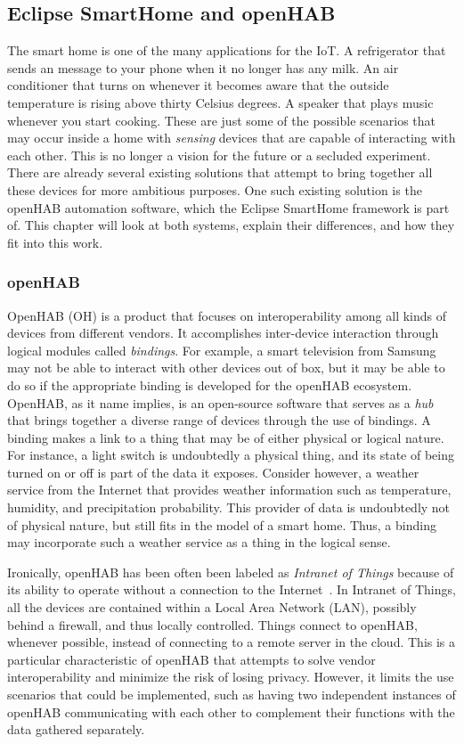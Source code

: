 \documentclass[12pt]{article}
\begin{document}
\subsection{Eclipse SmartHome and openHAB}

The smart home is one of the many applications for the IoT. A refrigerator that sends an message to your phone when it no longer has any milk. An air conditioner that turns on whenever it becomes aware that the outside temperature is rising above thirty Celsius degrees. A speaker that plays music whenever you start cooking. These are just some of the possible scenarios that may occur inside a home with \emph{sensing} devices that are capable of interacting with each other. This is no longer a vision for the future or a secluded experiment. There are already several existing solutions that attempt to bring together all these devices for more ambitious purposes. One such existing solution is the openHAB automation software, which the Eclipse SmartHome framework is part of. This chapter will look at both systems, explain their differences, and how they fit into this work. 

\subsubsection{openHAB}
\label{sssec:oh}
OpenHAB (OH) is a product that focuses on interoperability among all kinds of devices from different vendors. It accomplishes inter-device interaction through logical modules called \emph{bindings}. For example, a smart television from Samsung may not be able to interact with other devices out of box, but it may be able to do so if the appropriate binding is developed for the openHAB ecosystem. OpenHAB, as it name implies, is an open-source software that serves as a \emph{hub} that brings together a diverse range of devices through the use of bindings. A binding makes a link to a thing that may be of either physical or logical nature. For instance, a light switch is undoubtedly a physical thing, and its state of being turned on or off is part of the data it exposes. Consider however, a weather service from the Internet that provides weather information such as temperature, humidity, and precipitation probability. This provider of data is undoubtedly not of physical nature, but still fits in the model of a smart home. Thus, a binding may incorporate such a weather service as a thing in the logical sense.

Ironically, openHAB has been often been labeled as \emph{Intranet of Things} because of its ability to operate without a connection to the Internet~\cite{openhab_03}. In Intranet of Things, all the devices are contained within a Local Area Network (LAN), possibly behind a firewall, and thus locally controlled. Things connect to openHAB, whenever possible, instead of connecting to a remote server in the cloud. This is a particular characteristic of openHAB that attempts to solve vendor interoperability and minimize the risk of losing privacy. However, it limits the use scenarios that could be implemented, such as having two independent instances of openHAB communicating with each other to complement their functions with the data gathered separately.
\end{document}
